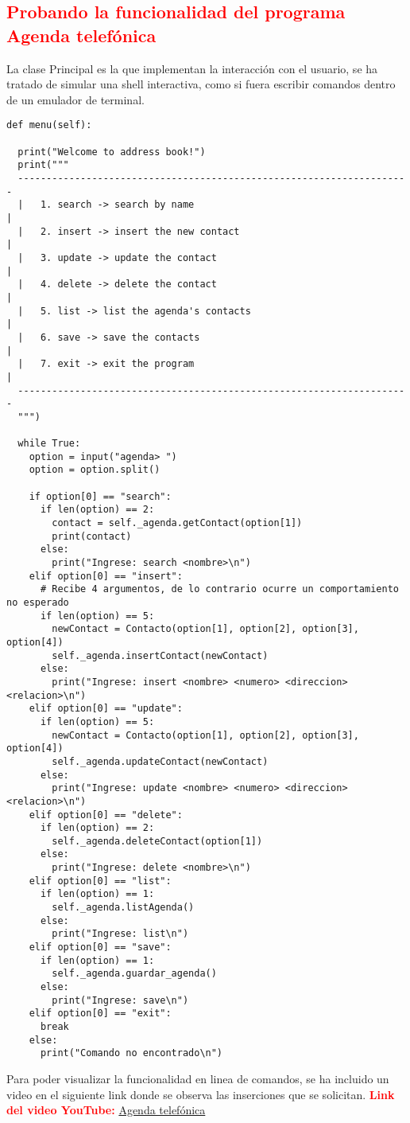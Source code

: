 \subsection{\textcolor{red}{Probando la funcionalidad del programa Agenda telefónica}}
La clase Principal es la que implementan la interacción con el usuario, se ha tratado de simular una shell interactiva, como si fuera escribir comandos dentro de un emulador de terminal.

\begin{verbatim}
def menu(self):

  print("Welcome to address book!")
  print("""
  ---------------------------------------------------------------------
  |   1. search -> search by name                                     |
  |   2. insert -> insert the new contact                             |
  |   3. update -> update the contact                                 |
  |   4. delete -> delete the contact                                 |
  |   5. list -> list the agenda's contacts                           |
  |   6. save -> save the contacts                                    |
  |   7. exit -> exit the program                                     |
  ---------------------------------------------------------------------
  """)

  while True:
    option = input("agenda> ")
    option = option.split()

    if option[0] == "search":
      if len(option) == 2:
        contact = self._agenda.getContact(option[1])
        print(contact)
      else:
        print("Ingrese: search <nombre>\n")
    elif option[0] == "insert":
      # Recibe 4 argumentos, de lo contrario ocurre un comportamiento no esperado
      if len(option) == 5:
        newContact = Contacto(option[1], option[2], option[3], option[4])
        self._agenda.insertContact(newContact)
      else:
        print("Ingrese: insert <nombre> <numero> <direccion> <relacion>\n")
    elif option[0] == "update":
      if len(option) == 5:
        newContact = Contacto(option[1], option[2], option[3], option[4])
        self._agenda.updateContact(newContact)
      else:
        print("Ingrese: update <nombre> <numero> <direccion> <relacion>\n")
    elif option[0] == "delete":
      if len(option) == 2:
        self._agenda.deleteContact(option[1])
      else:
        print("Ingrese: delete <nombre>\n")
    elif option[0] == "list":
      if len(option) == 1:
        self._agenda.listAgenda()
      else:
        print("Ingrese: list\n")
    elif option[0] == "save":
      if len(option) == 1:
        self._agenda.guardar_agenda()
      else:
        print("Ingrese: save\n")
    elif option[0] == "exit":
      break
    else:
      print("Comando no encontrado\n")
\end{verbatim}

Para poder visualizar la funcionalidad en linea de comandos, se ha incluido un video en el siguiente link donde se observa las inserciones que se solicitan.
\singlespacing
\textcolor{red}{\textbf{Link del video YouTube:}} \href{https://youtu.be/TQ0Thgi5O5g}{Agenda telefónica}
